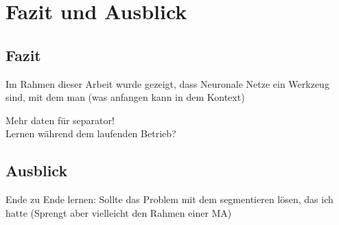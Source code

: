 \chapter{Fazit und Ausblick}


\section{Fazit}

Im Rahmen dieser Arbeit wurde gezeigt, dass Neuronale Netze ein Werkzeug sind, mit dem man (was anfangen kann in dem Kontext)


Mehr daten für separator!\\
Lernen während dem laufenden Betrieb?

\section{Ausblick}


Ende zu Ende lernen: Sollte das Problem mit dem segmentieren lösen, das ich hatte
(Sprengt aber vielleicht den Rahmen einer MA)